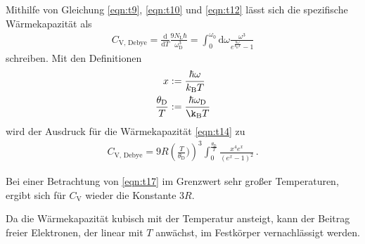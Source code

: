Mithilfe von Gleichung \ref{eqn:t9}, \ref{eqn:t10} und \ref{eqn:t12}
lässt sich die spezifische Wärmekapazität als
\begin{align}
	C_{\text{V, Debye}} = \frac{\mathrm{d}}{\mathrm{d}T} \frac{9 N_{\text{L}} \hbar}{\omega_{\text{D}}^{3}}
	= \int_{0}^{\omega_{0}} \mathrm{d}\omega \frac{\omega^{3}}{e^{\frac{\hbar \omega}{k_{\text{B}} T}} - 1} \label{eqn:t14}
\end{align}
schreiben.
Mit den Definitionen
\begin{align}
	x &:= \frac{\hbar \omega}{k_{\text{B}} T} \label{eqn:t15} \\
	\frac{\theta_{\text{D}}}{T} &:= \frac{\hbar \omega_{\text{D}}}{\k_{\text{B}} T} \label{eqn:t16}
\end{align}
wird der Ausdruck für die Wärmekapazität \ref{eqn:t14} zu
\begin{align}
	C_{\text{V, Debye}} = 9 R \left(\frac{T}{\theta_{\text{D}}})\right)^{3}
	\int_{0}^{\frac{\theta_{\text{D}}}{T}} \frac{x^{4} e^{x}}{\left( e^{x} - 1 \right)^{2}} \, . \label{eqn:t17}
\end{align}

Bei einer Betrachtung von \ref{eqn:t17} im Grenzwert sehr großer Temperaturen,
ergibt sich für $C_{\text{V}}$ wieder die Konstante $3R$.

Da die Wärmekapazität kubisch mit der Temperatur ansteigt, kann der Beitrag freier Elektronen, der linear mit $T$ anwächst, im Festkörper vernachlässigt werden.



\cite{sample}
